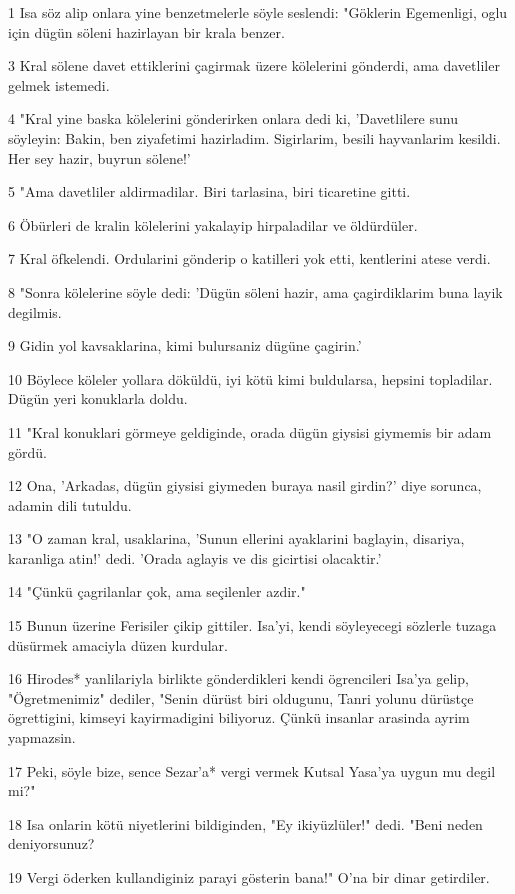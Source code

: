 \par 1 Isa söz alip onlara yine benzetmelerle söyle seslendi: "Göklerin Egemenligi, oglu için dügün söleni hazirlayan bir krala benzer.
\par 3 Kral sölene davet ettiklerini çagirmak üzere kölelerini gönderdi, ama davetliler gelmek istemedi.
\par 4 "Kral yine baska kölelerini gönderirken onlara dedi ki, 'Davetlilere sunu söyleyin: Bakin, ben ziyafetimi hazirladim. Sigirlarim, besili hayvanlarim kesildi. Her sey hazir, buyrun sölene!'
\par 5 "Ama davetliler aldirmadilar. Biri tarlasina, biri ticaretine gitti.
\par 6 Öbürleri de kralin kölelerini yakalayip hirpaladilar ve öldürdüler.
\par 7 Kral öfkelendi. Ordularini gönderip o katilleri yok etti, kentlerini atese verdi.
\par 8 "Sonra kölelerine söyle dedi: 'Dügün söleni hazir, ama çagirdiklarim buna layik degilmis.
\par 9 Gidin yol kavsaklarina, kimi bulursaniz dügüne çagirin.'
\par 10 Böylece köleler yollara döküldü, iyi kötü kimi buldularsa, hepsini topladilar. Dügün yeri konuklarla doldu.
\par 11 "Kral konuklari görmeye geldiginde, orada dügün giysisi giymemis bir adam gördü.
\par 12 Ona, 'Arkadas, dügün giysisi giymeden buraya nasil girdin?' diye sorunca, adamin dili tutuldu.
\par 13 "O zaman kral, usaklarina, 'Sunun ellerini ayaklarini baglayin, disariya, karanliga atin!' dedi. 'Orada aglayis ve dis gicirtisi olacaktir.'
\par 14 "Çünkü çagrilanlar çok, ama seçilenler azdir."
\par 15 Bunun üzerine Ferisiler çikip gittiler. Isa'yi, kendi söyleyecegi sözlerle tuzaga düsürmek amaciyla düzen kurdular.
\par 16 Hirodes* yanlilariyla birlikte gönderdikleri kendi ögrencileri Isa'ya gelip, "Ögretmenimiz" dediler, "Senin dürüst biri oldugunu, Tanri yolunu dürüstçe ögrettigini, kimseyi kayirmadigini biliyoruz. Çünkü insanlar arasinda ayrim yapmazsin.
\par 17 Peki, söyle bize, sence Sezar'a* vergi vermek Kutsal Yasa'ya uygun mu degil mi?"
\par 18 Isa onlarin kötü niyetlerini bildiginden, "Ey ikiyüzlüler!" dedi. "Beni neden deniyorsunuz?
\par 19 Vergi öderken kullandiginiz parayi gösterin bana!" O'na bir dinar getirdiler.

